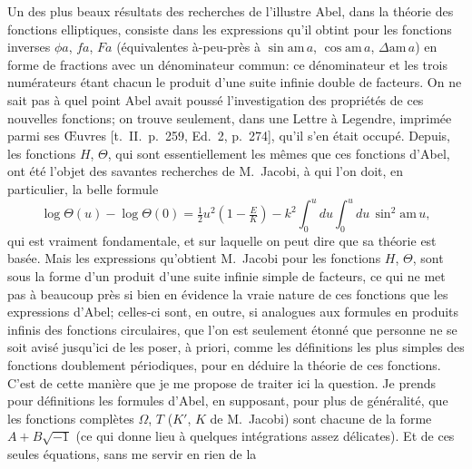 \documentclass[12pt,a4paper]{article}
\begin{document}
Un des plus beaux r\'esultats des recherches de l'illustre Abel, dans la th\'eorie des fonctions elliptiques, consiste dans les expressions qu'il obtint pour les fonctions inverses $\phi a$, $fa$, $Fa$ (\'equivalentes \`a-peu-pr\`es \`a $\sin\mathrm{am}\,a$, $\cos\mathrm{am}\,a$, $\Delta\mathrm{am}\,a$) en forme de fractions avec un d\'enominateur commun: ce d\'enominateur et les trois num\'erateurs \'etant chacun le produit d'une suite infinie double de facteurs. On ne sait pas \`a quel point Abel avait pouss\'e l'investigation des propri\'et\'es de ces nouvelles fonctions; on trouve seulement, dans une Lettre \`a Legendre, imprim\'ee parmi ses {\OE}uvres [t.~II.~p.~259, Ed.~2, p.~274], qu'il s'en \'etait occup\'e. Depuis, les fonctions $H$, $\Theta$, qui sont essentiellement les m\^emes que ces fonctions d'Abel, ont \'et\'e l'objet des savantes recherches de M.~Jacobi, \`a qui l'on doit, en particulier, la belle formule
\[
\log\Theta(u) - \log\Theta(0) = \tfrac{1}{2}u^2\!\left(1 - \tfrac{E}{K}\right) - k^2\int_0^u du\int_0^u du\,\sin^2\mathrm{am}\,u,
\]
qui est vraiment fondamentale, et sur laquelle on peut dire que sa th\'eorie est bas\'ee. Mais les expressions qu'obtient M.~Jacobi pour les fonctions $H$, $\Theta$, sont sous la forme d'un produit d'une suite infinie simple de facteurs, ce qui ne met pas \`a beaucoup pr\`es si bien en \'evidence la vraie nature de ces fonctions que les expressions d'Abel; celles-ci sont, en outre, si analogues aux formules en produits infinis des fonctions circulaires, que l'on est seulement \'etonn\'e que personne ne se soit avis\'e jusqu'ici de les poser, \`a priori, comme les d\'efinitions les plus simples des fonctions doublement p\'eriodiques, pour en d\'eduire la th\'eorie de ces fonctions. C'est de cette mani\`ere que je me propose de traiter ici la question. Je prends pour d\'efinitions les formules d'Abel, en supposant, pour plus de g\'en\'eralit\'e, que les fonctions compl\`etes $\Omega$, $T$ ($K'$, $K$ de M.~Jacobi) sont chacune de la forme $A + B\sqrt{-1}$ (ce qui donne lieu \`a quelques int\'egrations assez d\'elicates). Et de ces seules \'equations, sans me servir en rien de la

\newpage
\setcounter{page}{157}
\end{document}
